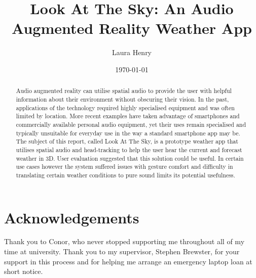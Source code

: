 \documentclass{l4proj}
\begin{document}
\title{Look At The Sky: An Audio Augmented Reality Weather App} %
\author{Laura Henry}
\date{\today}

\maketitle

\begin{abstract}
   Audio augmented reality can utilise spatial audio to provide the user with helpful information about their environment without obscuring their vision. In the past, applications of the technology required highly specialised equipment and was often limited by location. More recent examples have taken advantage of smartphones and commercially available personal audio equipment, yet their uses remain specialised and typically unsuitable for everyday use in the way a standard smartphone app may be. The subject of this report, called Look At The Sky, is a prototype weather app that utilises spatial audio and head-tracking to help the user hear the current and forecast weather in 3D. User evaluation suggested that this solution could be useful. In certain use cases however the system suffered issues with gesture comfort and difficulty in translating certain weather conditions to pure sound limits its potential usefulness.
\end{abstract}

\chapter*{Acknowledgements}


Thank you to Conor, who never stopped supporting me throughout all of my time at university.
Thank you to my supervisor, Stephen Brewster, for your support in this process and for helping me arrange an emergency laptop loan at short notice.

%
%
\def\consentname {Laura McCallum Henry} %
\def\consentdate {\today} %
%
\educationalconsent
\end{document}
